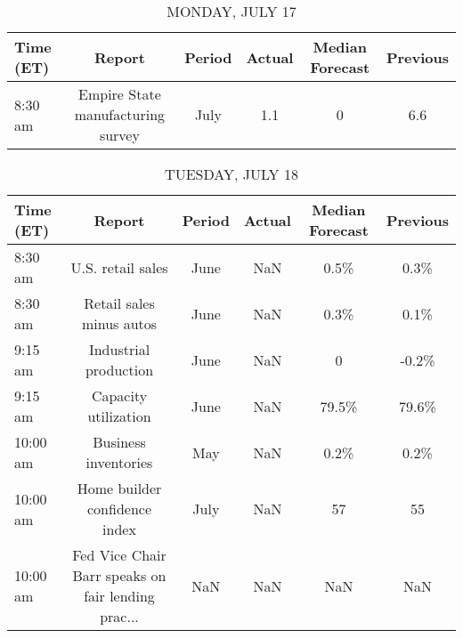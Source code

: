 \documentclass{article}%
\begin{document}
%
\normalsize%


\begin{table}[htbp]%
\caption{MONDAY, JULY 17}%
\centering%
\begin{adjustbox}{width=1\textwidth}%
\begin{tabular}{lccccc}
\toprule
Time (ET) &                            Report & Period & Actual & Median Forecast & Previous \\
\midrule
  8:30 am & Empire State manufacturing survey &   July &    1.1 &               0 &      6.6 \\
\bottomrule
\end{tabular}
%
\end{adjustbox}%
\end{table}

%


\begin{table}[htbp]%
\caption{TUESDAY, JULY 18}%
\centering%
\begin{adjustbox}{width=1\textwidth}%
\begin{tabular}{lccccc}
\toprule
Time (ET) &                                             Report & Period & Actual & Median Forecast & Previous \\
\midrule
  8:30 am &                                  U.S. retail sales &   June &    NaN &            0.5\% &     0.3\% \\
  8:30 am &                           Retail sales minus autos &   June &    NaN &            0.3\% &     0.1\% \\
  9:15 am &                              Industrial production &   June &    NaN &               0 &    -0.2\% \\
  9:15 am &                               Capacity utilization &   June &    NaN &           79.5\% &    79.6\% \\
 10:00 am &                               Business inventories &    May &    NaN &            0.2\% &     0.2\% \\
 10:00 am &                      Home builder confidence index &   July &    NaN &              57 &       55 \\
 10:00 am & Fed Vice Chair Barr speaks on fair lending prac... &    NaN &    NaN &             NaN &      NaN \\
\bottomrule
\end{tabular}
%
\end{adjustbox}%
\end{table}

%
\end{document}
